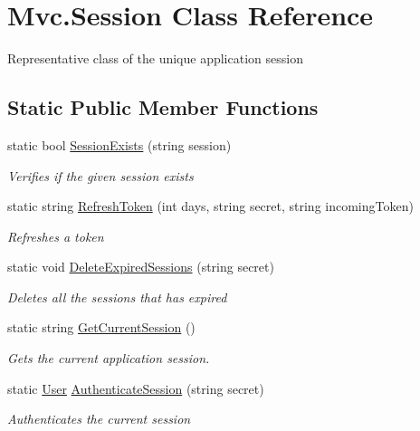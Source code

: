\hypertarget{class_mvc_1_1_session}{}\section{Mvc.\+Session Class Reference}
\label{class_mvc_1_1_session}


Representative class of the unique application session  


\subsection*{Static Public Member Functions}
\begin{DoxyCompactItemize}
\item 
static bool \hyperlink{class_mvc_1_1_session_af8c262ab22ef4a5becba55ebc8462c8e}{Session\+Exists} (string session)
\begin{DoxyCompactList}\small\item\em Verifies if the given session exists \end{DoxyCompactList}\item 
static string \hyperlink{class_mvc_1_1_session_ab24193deeef697f9d6460050883b483c}{Refresh\+Token} (int days, string secret, string incoming\+Token)
\begin{DoxyCompactList}\small\item\em Refreshes a token \end{DoxyCompactList}\item 
static void \hyperlink{class_mvc_1_1_session_a0dd0abe92e2b3450210cfc92dfbd9ca3}{Delete\+Expired\+Sessions} (string secret)
\begin{DoxyCompactList}\small\item\em Deletes all the sessions that has expired \end{DoxyCompactList}\item 
static string \hyperlink{class_mvc_1_1_session_a0275ee719fa9f087ad8f0b96fc2a88a3}{Get\+Current\+Session} ()
\begin{DoxyCompactList}\small\item\em Gets the current application session. \end{DoxyCompactList}\item 
static \hyperlink{class_mvc_1_1_user}{User} \hyperlink{class_mvc_1_1_session_a348ab46e42ba38bd10246fb39541d1e8}{Authenticate\+Session} (string secret)
\begin{DoxyCompactList}\small\item\em Authenticates the current session \end{DoxyCompactList}\item 

\end{DoxyCompactItemize}
